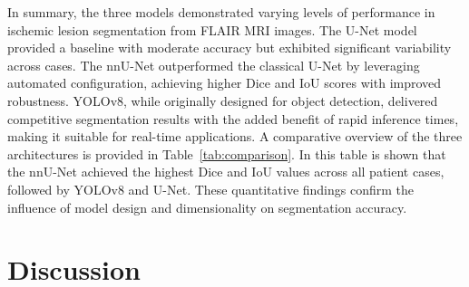 \documentclass[12pt]{article}
\begin{document}
In summary, the three models demonstrated varying levels of performance in ischemic lesion segmentation from FLAIR MRI images. The U-Net model provided a baseline with moderate accuracy but exhibited significant variability across cases. The nnU-Net outperformed the classical U-Net by leveraging automated configuration, achieving higher Dice and IoU scores with improved robustness. YOLOv8, while originally designed for object detection, delivered competitive segmentation results with the added benefit of rapid inference times, making it suitable for real-time applications. A comparative overview of the three architectures is provided in Table~\ref{tab:comparison}. In this table is shown that the nnU-Net achieved the highest Dice and IoU values across all patient cases, followed by YOLOv8 and U-Net. These quantitative findings confirm the influence of model design and dimensionality on segmentation accuracy.

\begin{table}[tp]
\centering
{}
\caption{Comparison of segmentation models on the test set (N=25). The nnU-Net achieved the highest Dice and IoU scores, indicating superior segmentation accuracy and robustness. YOLOv8 provided competitive performance with efficient inference, while U-Net showed limited generalization capabilities.}
\label{tab:comparison}
\end{table}

\section{Discussion}\label{sec:discussion}

\end{document}

